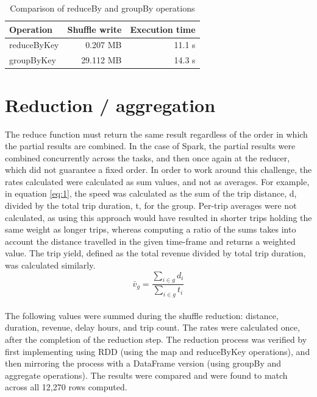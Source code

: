 \documentclass[conference]{IEEEtran}
\begin{document}
\begin{table}[t]
\centering
\caption{Comparison of reduceBy and groupBy operations}
\label{tab:shuffle-grouping}
\begin{tabular}{lrr}\toprule
Operation & Shuffle write & Execution time \\\midrule
reduceByKey & 0.207 MB & 11.1 s \\
groupByKey & 29.112 MB & 14.3 s \\\bottomrule
\end{tabular}
\end{table}

\section{Reduction / aggregation}
The reduce function must return the same result regardless of the order in which the partial results are combined. In the case of Spark, the partial results were combined concurrently across the tasks, and then once again at the reducer, which did not guarantee a fixed order. In order to work around this challenge, the rates calculated were calculated as sum values, and not as averages. For example, in equation \ref{eq:1}, the speed was calculated as the sum of the trip distance, d, divided by the total trip duration, t, for the group. Per-trip averages were not calculated, as using this approach would have resulted in shorter trips holding the same weight as longer trips, whereas computing a ratio of the sums takes into account the distance travelled in the given time-frame and returns a weighted value. The trip yield, defined as the total revenue divided by total trip duration, was calculated similarly.\\

\begin{equation}
\label{eq:1}
\bar{v}_{g} = \frac{\sum_{i \in g} d_{i}}{\sum_{i \in g} t_{i}}
\end{equation}\\

The following values were summed during the shuffle reduction: distance, duration, revenue, delay hours, and trip count. The rates were calculated once, after the completion of the reduction step. The reduction process was verified by first implementing using RDD (using the map and reduceByKey operations), and then mirroring the process with a DataFrame version (using groupBy and aggregate operations). The results were compared and were found to match across all 12,270 rows computed. \\
\end{document}
